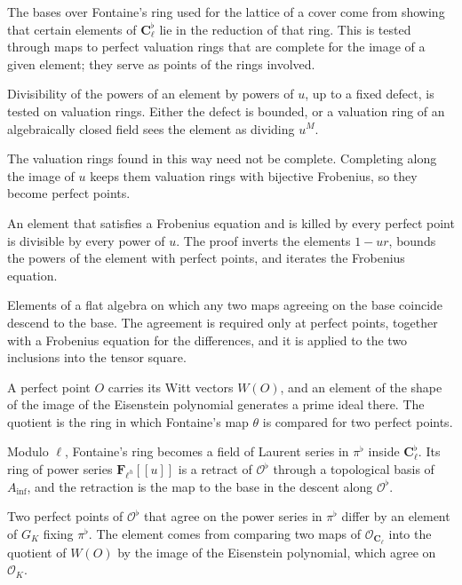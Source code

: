 The bases over Fontaine's ring used for the lattice of a cover come from showing that certain elements of
$\mathbf C_\ell^\flat$ lie in the reduction of that ring. This is tested through maps to perfect valuation rings
that are complete for the image of a given element; they serve as points of the rings involved.

Divisibility of the powers of an element by powers of $u$, up to a fixed defect, is tested on valuation rings.
Either the defect is bounded, or a valuation ring of an algebraically closed field sees the element as dividing
$u^M$.

The valuation rings found in this way need not be complete. Completing along the image of $u$ keeps them
valuation rings with bijective Frobenius, so they become perfect points.

An element that satisfies a Frobenius equation and is killed by every perfect point is divisible by every power
of $u$. The proof inverts the elements $1-ur$, bounds the powers of the element with perfect points, and iterates
the Frobenius equation.

Elements of a flat algebra on which any two maps agreeing on the base coincide descend to the base. The agreement
is required only at perfect points, together with a Frobenius equation for the differences, and it is applied to
the two inclusions into the tensor square.

A perfect point $O$ carries its Witt vectors $W(O)$, and an element of the shape of the image of the Eisenstein
polynomial generates a prime ideal there. The quotient is the ring in which Fontaine's map $\theta$ is compared
for two perfect points.

Modulo $\ell$, Fontaine's ring becomes a field of Laurent series in $\pi^\flat$ inside $\mathbf C_\ell^\flat$. Its
ring of power series $\mathbf F_{\ell^h}[[u]]$ is a retract of $\mathcal O^\flat$ through a topological basis of
$A_{\inf}$, and the retraction is the map to the base in the descent along $\mathcal O^\flat$.

Two perfect points of $\mathcal O^\flat$ that agree on the power series in $\pi^\flat$ differ by an element of
$G_K$ fixing $\pi^\flat$. The element comes from comparing two maps of $\mathcal O_{\mathbf C_\ell}$ into the
quotient of $W(O)$ by the image of the Eisenstein polynomial, which agree on $\mathcal O_K$.

